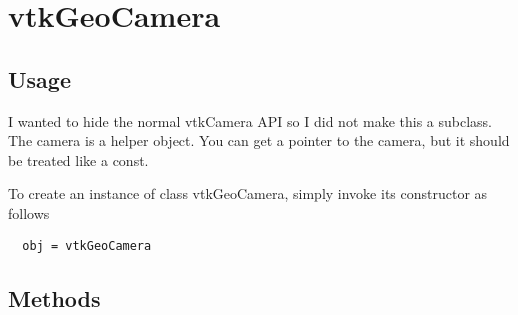 \section{vtkGeoCamera}

\subsection{Usage}

 I wanted to hide the normal vtkCamera API
 so I did not make this a subclass.  The camera is a helper object.
 You can get a pointer to the camera, but it should be treated like
 a const.

To create an instance of class vtkGeoCamera, simply
invoke its constructor as follows
\begin{verbatim}
  obj = vtkGeoCamera
\end{verbatim}
\subsection{Methods}

